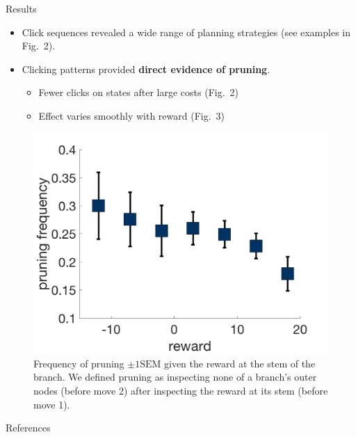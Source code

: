 \documentclass[final]{beamer}
\newlength{\onecolwid}
\begin{document}
\begin{frame}[t, fragile]
\begin{columns}[t]
\begin{column}{\onecolwid}
  \begin{block}{Results}\label{results}
  \begin{itemize}
    \item Click sequences revealed a wide range of planning strategies (see examples in Fig.~2).
    \item Clicking patterns provided \textbf{direct evidence of pruning}.
    \begin{itemize}
      \item Fewer clicks on states after large costs (Fig.~2)
      \item Effect varies smoothly with reward (Fig.~3)
    \end{itemize}
    \end{itemize}
  \end{block}

  \begin{figure}
    \label{fig:pruning}
    \includegraphics[width=0.9\linewidth]{figs/prunning_any_noFB.png}
    \captionsetup{width=0.9\linewidth}
    \caption[first]{Frequency of pruning $\pm 1 \text{SEM}$ given the reward at the stem of the branch. We defined pruning as inspecting none of a branch's outer nodes (before move 2) after inspecting the reward at its stem (before move 1).}
  \end{figure}

  \begin{block}{References}\label{references}
    
    \tiny
    
  \end{block}



\end{column}
\end{columns}
\end{frame}
\end{document}
